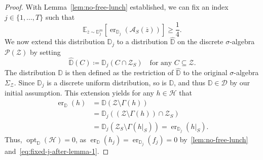 \begin{proof}
    With Lemma~\ref{lem:no-free-lunch} established, we can fix an index $j \in \{1, \dots, T\}$ such that
    \begin{equation}
        \label{eq:fixed-j-after-lemma-1}
        \mathbb{E}_{\overline{z} \sim \mathbb{D}_j^m} \left[ \operatorname{er}_{\mathbb{D}_j}(\mathcal{A}_S(\overline{z})) \right] \ge \frac{1}{4}.
    \end{equation}
    We now extend this distribution $\mathbb{D}_j$ to a distribution $\widehat{\mathbb{D}}$ on the discrete $\sigma$-algebra $\mathcal{P}(\mathcal{Z})$ by setting
    \[
        \widehat{\mathbb{D}}(C) \coloneqq \mathbb{D}_j(C \cap \mathcal{Z}_S) \quad \text{for any } C \subseteq \mathcal{Z}.
    \]
    The distribution $\mathbb{D}$ is then defined as the restriction of $\widehat{\mathbb{D}}$ to the original $\sigma$-algebra $\Sigma_{\mathcal{Z}}$. Since $\mathbb{D}_j$ is a discrete uniform distribution, so is $\mathbb{D}$, and thus $\mathbb{D} \in \mathcal{D}$ by our initial assumption. This extension yields for any $h \in \mathcal{H}$ that
    \begin{align}
        \operatorname{er}_{\mathbb{D}}(h) &= \mathbb{D}(\mathcal{Z} \setminus \Gamma(h)) \nonumber \\
        &= \mathbb{D}_j((\mathcal{Z} \setminus \Gamma(h)) \cap \mathcal{Z}_S) \nonumber \\
        &= \mathbb{D}_j(\mathcal{Z}_S \setminus \Gamma(h|_S)) = \operatorname{er}_{\mathbb{D}_j}(h|_S). \label{eq:error-equivalence}
    \end{align}
    Thus, $\operatorname{opt}_{\mathbb{D}}(\mathcal{H}) = 0$, as $\operatorname{er}_{\mathbb{D}}(h_j) = \operatorname{er}_{\mathbb{D}_j}(f_j) = 0$ by~\ref{lem:no-free-lunch} and~\ref{eq:fixed-j-after-lemma-1}.
\end{proof}